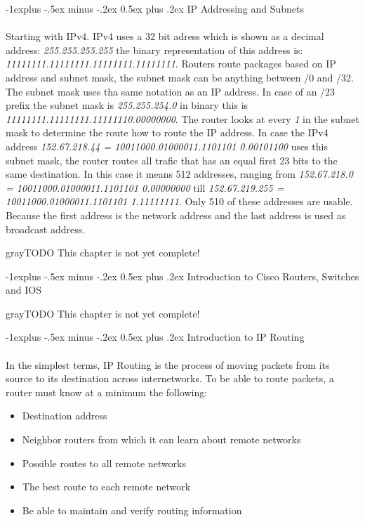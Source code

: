 \documentclass[10pt,landscape]{article}
\makeatletter
\renewcommand{\subsection}{\@startsection{subsection}{2}{0mm}%
                                {-1explus -.5ex minus -.2ex}%
                                {0.5ex plus .2ex}%
                                {\normalfont\normalsize\bfseries}}
\makeatother
\begin{document}
\begin{multicols}{3}
\subsection{IP Addressing and Subnets}
\paragraph{}
Starting with IPv4. IPv4 uses a 32 bit adress which is shown as a decimal address: \textit{255.255.255.255} the binary representation of this
address is: \textit{11111111.11111111.11111111.11111111}. Routers route packages based on IP address and subnet mask,
the subnet mask can be anything between /0 and /32. The subnet mask uses tha same notation as an IP address.
In case of an /23 prefix the subnet mask is \textit{255.255.254.0} in binary this is \textit{11111111.11111111.11111110.00000000}.
The router looks at every \textit{1} in the subnet mask to determine the route how to route the IP address. In case the IPv4 address
\textit{152.67.218.44 = 10011000.01000011.1101101 0.00101100} uses this subnet mask, the router routes all trafic that has
an equal first 23 bits to the same destination. In this case it means 512 addresses, ranging from
\textit{152.67.218.0 = 10011000.01000011.1101101 0.00000000} till \textit{152.67.219.255 = 10011000.01000011.1101101 1.11111111}.
Only 510 of these addresses are usable. Because the first address is the network address and the last address is used as broadcast address.
\begin{textbox}{gray}{TODO}
	This chapter is not yet complete!
\end{textbox}

\subsection{Introduction to Cisco Routers, Switches and IOS}
\begin{textbox}{gray}{TODO}
	This chapter is not yet complete!
\end{textbox}
\subsection{Introduction to IP Routing}
\paragraph{}
In the simplest terms, IP Routing is the process of moving packets from its source to its destination across internetworks. To be able to route packets, a router must know at a minimum the following:
\begin{itemize}
    \item Destination address
    \item Neighbor routers from which it can learn about remote networks
    \item Possible routes to all remote networks
    \item The best route to each remote network
    \item Be able to maintain and verify routing information
\end{itemize}

\end{multicols}
\end{document}
